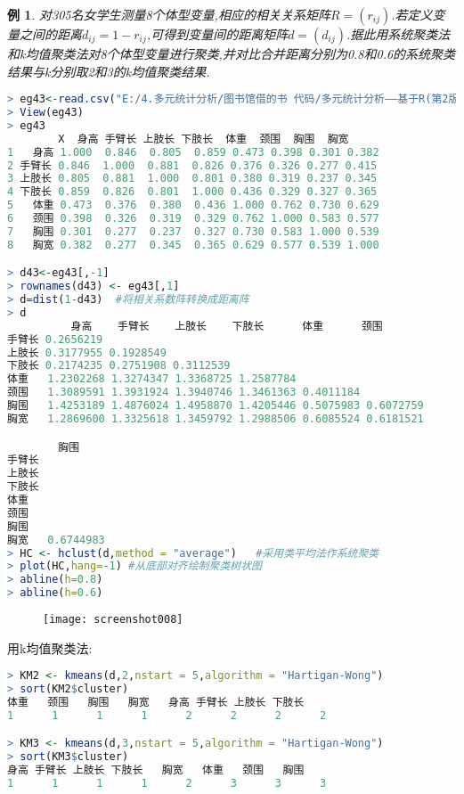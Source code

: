 \documentclass[11pt,a4paper,oneside]{book}
\newtheorem{e}{例}
\begin{document}
\begin{e}
对305名女学生测量8个体型变量,相应的相关关系矩阵$ R=(r_{ij}) $.若定义变量之间的距离$ d_{ij}=1-r_{ij} $,可得到变量间的距离矩阵$ d=(d_{ij}) $.据此用系统聚类法和k均值聚类法对8个体型变量进行聚类,并对比合并距离分别为0.8和0.6的系统聚类结果与k分别取2和3的k均值聚类结果.
\end{e}
\begin{lstlisting}[language=r]
> eg43<-read.csv("E:/4.多元统计分析/图书馆借的书 代码/多元统计分析——基于R(第2版) R-data/eg4.3.csv")
> View(eg43)
> eg43
        X  身高 手臂长 上肢长 下肢长  体重  颈围  胸围  胸宽
1   身高 1.000  0.846  0.805  0.859 0.473 0.398 0.301 0.382
2 手臂长 0.846  1.000  0.881  0.826 0.376 0.326 0.277 0.415
3 上肢长 0.805  0.881  1.000  0.801 0.380 0.319 0.237 0.345
4 下肢长 0.859  0.826  0.801  1.000 0.436 0.329 0.327 0.365
5   体重 0.473  0.376  0.380  0.436 1.000 0.762 0.730 0.629
6   颈围 0.398  0.326  0.319  0.329 0.762 1.000 0.583 0.577
7   胸围 0.301  0.277  0.237  0.327 0.730 0.583 1.000 0.539
8   胸宽 0.382  0.277  0.345  0.365 0.629 0.577 0.539 1.000

> d43<-eg43[,-1]
> rownames(d43) <- eg43[,1]
> d=dist(1-d43)  #将相关系数阵转换成距离阵
> d
          身高    手臂长    上肢长    下肢长      体重      颈围
手臂长 0.2656219                                                  
上肢长 0.3177955 0.1928549                                        
下肢长 0.2174235 0.2751908 0.3112539                              
体重   1.2302268 1.3274347 1.3368725 1.2587784                    
颈围   1.3089591 1.3931924 1.3940746 1.3461363 0.4011184          
胸围   1.4253189 1.4876024 1.4958870 1.4205446 0.5075983 0.6072759
胸宽   1.2869600 1.3325618 1.3459792 1.2988506 0.6085524 0.6181521

        胸围
手臂长          
上肢长          
下肢长          
体重            
颈围            
胸围            
胸宽   0.6744983
> HC <- hclust(d,method = "average")   #采用类平均法作系统聚类
> plot(HC,hang=-1) #从底部对齐绘制聚类树状图
> abline(h=0.8)
> abline(h=0.6)
\end{lstlisting}
\begin{figure}[H]
	\centering
	\texttt{[image: screenshot008]}
\end{figure}

用k均值聚类法:
\begin{lstlisting}[language=r]
> KM2 <- kmeans(d,2,nstart = 5,algorithm = "Hartigan-Wong")
> sort(KM2$cluster)
体重   颈围   胸围   胸宽   身高 手臂长 上肢长 下肢长 
1      1      1      1      2      2      2      2 

> KM3 <- kmeans(d,3,nstart = 5,algorithm = "Hartigan-Wong")
> sort(KM3$cluster)
身高 手臂长 上肢长 下肢长   胸宽   体重   颈围   胸围 
1      1      1      1      2      3      3      3 
\end{lstlisting}
\end{document}
